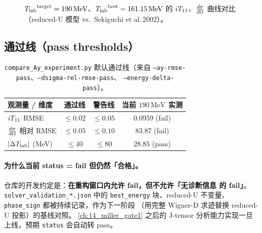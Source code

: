 \begin{figure}[h]
\centering
{}
\caption{\({T_{\text{lab}}}^{\text{target}} = 190\,\text{MeV}\)、\({T_{\text{lab}}}^{\text{best}}
= 161.15\,\text{MeV}\) 的 \({i T_{11}}\)、\(\frac{d\sigma}{d\Omega}\) 曲线对比（reduced-U
模型 vs.\ Sekiguchi et al.\,2002）。}
\label{fig:ch13-comparison}
\end{figure}

\subsection{通过线（pass thresholds）}
\label{subsec:ch13-thresholds}

\begin{table}[h]
\centering
\caption{\texttt{compare\_Ay\_experiment.py} 默认通过线（来自
\texttt{--ay-rmse-pass}、\texttt{--dsigma-rel-rmse-pass}、
\texttt{--energy-delta-pass}）。}
\label{tab:ch13-thresholds}
\begin{tabular}{lccc}
\toprule
观测量 / 维度 & 通过线 & 警告线 & 当前 \(190\,\text{MeV}\) 实测 \\
\midrule
\({i T_{11}}\) RMSE          & \(\le 0.02\) & \(\le 0.05\) & \(0.0959\) (fail) \\
\(\frac{d\sigma}{d\Omega}\) 相对 RMSE       & \(\le 0.05\) & \(\le 0.10\) & \(83.87\) (fail) \\
\(|\Delta{T_{\text{lab}}}|\) (MeV)     & \(\le 40\)   & \(\le 80\)   & \(28.85\) (pass) \\
\bottomrule
\end{tabular}
\end{table}

\paragraph{为什么当前 status = fail 但仍然「合格」。}
仓库的开发约定是：\textbf{在重构窗口内允许 fail，但不允许「无诊断信息
的 fail」}。\texttt{solver\_validation\_*.json} 中的 \texttt{best\_energy}
块、reduced-U 不变量、\texttt{phase\_sign} 都被持续记录，作为下一阶段
（用完整 Wigner-D 求迹替换 reduced-U 投影）的基线对照。
\cref{ch:14_miller_gate1} 之后的 J-tensor 分析能力实现一旦上线，预期
\texttt{status} 会自动转 pass。

